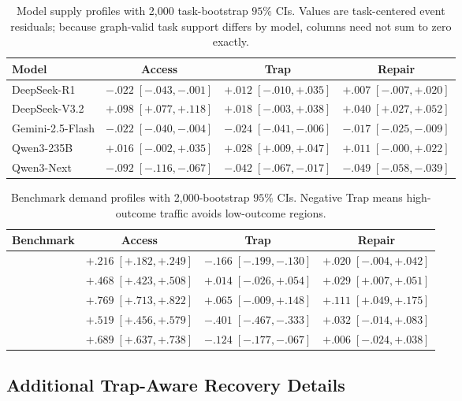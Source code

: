 \begin{table}[h]
\centering
\small
\setlength{\tabcolsep}{4pt}
\begin{tabular}{lccc}
\toprule
\textbf{Model} & \textbf{Access} & \textbf{Trap} & \textbf{Repair} \\
\midrule
DeepSeek-R1 & $-.022\;[-.043,-.001]$ & $+.012\;[-.010,+.035]$ & $+.007\;[-.007,+.020]$ \\
DeepSeek-V3.2 & $+.098\;[+.077,+.118]$ & $+.018\;[-.003,+.038]$ & $+.040\;[+.027,+.052]$ \\
Gemini-2.5-Flash & $-.022\;[-.040,-.004]$ & $-.024\;[-.041,-.006]$ & $-.017\;[-.025,-.009]$ \\
Qwen3-235B & $+.016\;[-.002,+.035]$ & $+.028\;[+.009,+.047]$ & $+.011\;[-.000,+.022]$ \\
Qwen3-Next & $-.092\;[-.116,-.067]$ & $-.042\;[-.067,-.017]$ & $-.049\;[-.058,-.039]$ \\
\bottomrule
\end{tabular}
\caption{Model supply profiles with 2,000 task-bootstrap $95\%$ CIs. Values are task-centered event residuals; because graph-valid task support differs by model, columns need not sum to zero exactly.}
\label{tab:model_profiles}
\end{table}

\begin{table}[h]
\centering
\small
\setlength{\tabcolsep}{4pt}
\begin{tabular}{lccc}
\toprule
\textbf{Benchmark} & \textbf{Access} & \textbf{Trap} & \textbf{Repair} \\
\midrule
\mcp{} & $+.216\;[+.182,+.249]$ & $-.166\;[-.199,-.130]$ & $+.020\;[-.004,+.042]$ \\
\searchb{} & $+.468\;[+.423,+.508]$ & $+.014\;[-.026,+.054]$ & $+.029\;[+.007,+.051]$ \\
\swe{} & $+.769\;[+.713,+.822]$ & $+.065\;[-.009,+.148]$ & $+.111\;[+.049,+.175]$ \\
\taub{} & $+.519\;[+.456,+.579]$ & $-.401\;[-.467,-.333]$ & $+.032\;[-.014,+.083]$ \\
\terminal{} & $+.689\;[+.637,+.738]$ & $-.124\;[-.177,-.067]$ & $+.006\;[-.024,+.038]$ \\
\bottomrule
\end{tabular}
\caption{Benchmark demand profiles with 2,000-bootstrap $95\%$ CIs. Negative Trap means high-outcome traffic avoids low-outcome regions.}
\label{tab:demand_vectors}
\end{table}

\subsection{Additional Trap-Aware Recovery Details}
\label{app:trap_intervention_more}

